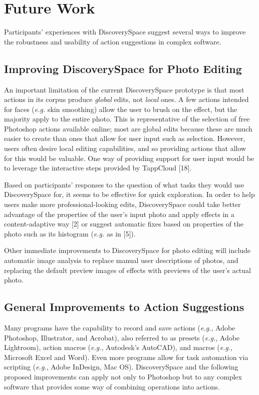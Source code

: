 \section{Future Work}
Participants' experiences with Discovery\-Space suggest several ways to improve the robustness and usability of action suggestions in complex software.

\subsection{Improving Discovery\-Space for Photo Editing}
An important limitation of the current Discovery\-Space prototype is that most actions in its corpus produce \textit{global} edits, not \textit{local} ones. A few actions intended for faces (\textit{e.g.} skin smoothing) allow the user to brush on the effect, but the majority apply to the entire photo. This is representative of the selection of free Photoshop actions available online; most are global edits because these are much easier to create than ones that allow for user input such as selection. However, users often desire local editing capabilities, and so providing actions that allow for this would be valuable. One way of providing support for user input would be to leverage the interactive steps provided by TappCloud [18].

Based on participants' responses to the question of what tasks they would use Discovery\-Space for, it seems to be effective for quick exploration. In order to help users make more professional-looking edits, Discovery\-Space could take better advantage of the properties of the user's input photo and apply effects in a content-adaptive way [2] or suggest automatic fixes based on properties of the photo such as its histogram (\textit{e.g.} as in [5]). 

Other immediate improvements to Discovery\-Space for photo editing will include automatic image analysis to replace manual user descriptions of photos, and replacing the default preview images of effects with previews of the user's actual photo.

\subsection{General Improvements to Action Suggestions}
Many programs have the capability to record and save actions (\textit{e.g.}, Adobe Photoshop, Illustrator, and Acrobat), also referred to as presets (\textit{e.g.}, Adobe Lightroom), action macros (\textit{e.g.}, Autodesk's AutoCAD), and macros (\textit{e.g.}, Microsoft Excel and Word). Even more programs allow for task automation via scripting (\textit{e.g.}, Adobe InDesign, Mac OS). Discovery\-Space and the following proposed improvements can apply not only to Photoshop but to any complex software that provides some way of combining operations into actions.


